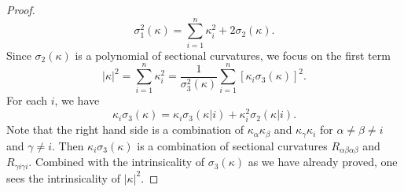 \documentclass[10pt,a4paper]{amsart}
\numberwithin{equation}{section}
\begin{document}
\begin{proof}
    \[ \sigma_1^2(\kappa) = \sum_{i=1}^{n}\kappa_i^2 + 2\sigma_2(\kappa). \]
    Since \(\sigma_2(\kappa)\) is a polynomial of sectional curvatures, we focus on the first term
    \[ |\kappa|^2 = \sum_{i=1}^{n} \kappa_i^2 = \frac{1}{\sigma_3^2(\kappa)}\sum_{i=1}^{n}[\kappa_i \sigma_3(\kappa)]^2. \]
    For each \(i\), we have
    \[ \kappa_i \sigma_3(\kappa) = \kappa_i\sigma_3(\kappa|i) + \kappa_i^2\sigma_2(\kappa|i). \]
    Note that the right hand side is a combination of \(\kappa_\alpha\kappa_\beta\) and \(\kappa_\gamma\kappa_i\) for \(\alpha\neq \beta\neq i\) and \(\gamma\neq i\). Then \(\kappa_i \sigma_3(\kappa)\) is a combination of sectional curvatures \(R_{\alpha\beta\alpha\beta}\) and \(R_{\gamma i \gamma i}\). Combined with the intrinsicality of \(\sigma_3(\kappa)\) as we have already proved, one sees the intrinsicality of \(|\kappa|^2\). 
\end{proof}
\end{document}
